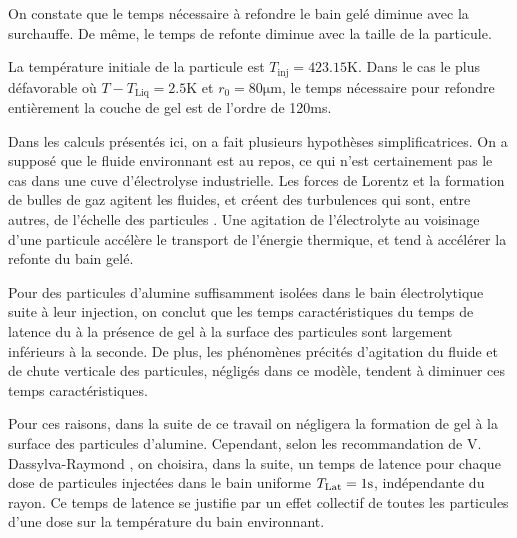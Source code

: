 On constate que le temps nécessaire à refondre le bain gelé
diminue avec la surchauffe. De même, le temps de refonte diminue avec
la taille de la particule.

La température initiale de la particule est $T_\text{inj} =
423.15\si{\kelvin}$. Dans le cas le plus défavorable où $T -
T_\text{Liq} = 2.5\si{\kelvin}$ et $r_0 = 80\si{\micro\meter}$, le
temps nécessaire pour refondre entièrement la couche de gel est de
l'ordre de 120\si{\milli\second}.

Dans les calculs présentés ici, on a fait plusieurs hypothèses
simplificatrices. On a supposé que le fluide environnant est au
repos, ce qui n'est certainement pas le cas dans une cuve
d'électrolyse industrielle. Les forces de Lorentz et la formation de
bulles de gaz agitent les fluides, et créent des turbulences qui sont,
entre autres, de l'échelle des particules \cite{Rochat2016}. Une
agitation de l'électrolyte au voisinage d'une particule accélère le
transport de l'énergie thermique, et tend à accélérer la refonte du
bain gelé.


Pour des particules d'alumine suffisamment isolées dans le bain
électrolytique suite à leur injection, on conclut que les temps
caractéristiques du temps de latence du à la présence de gel à
la surface des particules sont largement inférieurs à la seconde. De
plus, les phénomènes précités d'agitation du fluide et de
chute verticale des particules, négligés dans ce modèle, tendent à
diminuer ces temps caractéristiques.

Pour ces raisons, dans la suite de ce travail on négligera la
formation de gel à la surface des particules d'alumine. Cependant,
selon les recommandation de V. Dassylva-Raymond \cite{Dassylva2015}, on
choisira, dans la suite, un temps de latence pour chaque dose de
particules injectées dans le bain uniforme $T_\text{Lat} =
1\si{\second}$, indépendante du rayon. Ce temps de latence se justifie
par un effet collectif de toutes les particules d'une dose sur la
température du bain environnant.
